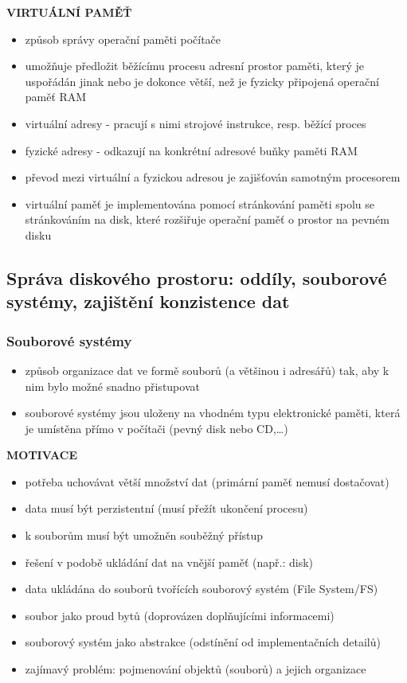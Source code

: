 \documentclass[10pt,a4paper]{article}
\begin{document}
\textbf{VIRTUÁLNÍ PAMĚŤ}
\begin{itemize}
	\item způsob správy operační paměti počítače
	\item umožňuje předložit běžícímu procesu adresní prostor paměti, který je uspořádán jinak nebo je dokonce větší, než je fyzicky připojená operační paměť RAM
	\item virtuální adresy - pracují s nimi strojové instrukce, resp. běžící proces
	\item fyzické adresy - odkazují na konkrétní adresové buňky paměti RAM
	\item převod mezi virtuální a fyzickou adresou je zajišťován samotným procesorem
	\item virtuální paměť je implementována pomocí stránkování paměti spolu se stránkováním na disk, které rozšiřuje operační paměť o prostor na pevném disku
\end{itemize}


\subsection{ Správa diskového prostoru: oddíly, souborové systémy, zajištění konzistence dat}

\subsubsection{Souborové systémy}
\begin{itemize}
	\item způsob organizace dat ve formě souborů (a většinou i adresářů) tak, aby k nim bylo možné snadno přistupovat
	\item souborové systémy jsou uloženy na vhodném typu elektronické paměti, která je umístěna přímo v počítači (pevný disk nebo CD,…)
\end{itemize}

\textbf{MOTIVACE}
\begin{itemize}
	\item potřeba uchovávat větší množství dat (primární paměť nemusí dostačovat)
	\item data musí být perzistentní (musí přežít ukončení procesu)
	\item k souborům musí být umožněn souběžný přístup
	\item řešení v podobě ukládání dat na vnější paměť (např.: disk)
	\item data ukládána do souborů tvořících souborový systém (File System/FS)
	\item soubor jako proud bytů (doprovázen doplňujícími informacemi)
	\item souborový systém jako abstrakce (odstínění od implementačních detailů)
	\item zajímavý problém: pojmenování objektů (souborů) a jejich organizace
\end{itemize}
\end{document}
